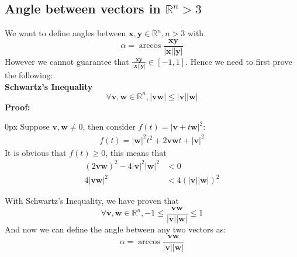 \documentclass{article}
\begin{document}
\subsection{Angle between vectors in $\mathbb{R}^n > 3$}
We want to define angles between $\mathbf{x}, \mathbf{y} \in \mathbb{R}^n, n > 3$ with
\begin{equation*}
    \alpha = \arccos\frac{\mathbf{x}\mathbf{y}}{|\mathbf{x}||\mathbf{y}|}
\end{equation*}
However we cannot guarantee that $\frac{\mathbf{x}\mathbf{y}}{|\mathbf{x}||\mathbf{y}|} \in [-1, 1]$. Hence we need to first prove the following:\\
\textbf{Schwartz's Inequality}
\begin{equation*}
    \forall \mathbf{v}, \mathbf{w} \in \mathbb{R}^n, |\mathbf{v}\mathbf{w}| \leq |\mathbf{v}||\mathbf{w}| \tag{1.4.5}
\end{equation*}
\textbf{Proof:}
\begin{addmargin}[10px]{0px}
    Suppose $\mathbf{v}, \mathbf{w} \neq 0$, then consider $f(t) = |\mathbf{v} + t \mathbf{w}|^2$:
    \begin{equation*}
        \begin{split}
            f(t) = |\mathbf{w}|^2 t^2 + 2\mathbf{v}\mathbf{w} t + |\mathbf{v}|^2
        \end{split}
    \end{equation*}
    It is obvious that $f(t) \geq 0$, this means that
    \begin{equation*}
        \begin{split}
            (2\mathbf{v}\mathbf{w})^2 - 4|\mathbf{v}|^2|\mathbf{w}|^2 &< 0\\
            4|\mathbf{v}\mathbf{w}|^2 &< 4(|\mathbf{v}||\mathbf{w}|)^2
        \end{split}
    \end{equation*}
\end{addmargin}
With Schwartz's Inequality, we have proven that
\begin{equation*}
\forall \mathbf{v}, \mathbf{w} \in \mathbb{R}^n, -1 \leq \frac{\mathbf{vw}}{|\mathbf{v}||\mathbf{w}|} \leq 1
\end{equation*}
And now we can define the angle between any two vectors as:
\begin{equation*}
    \alpha = \arccos \frac{\mathbf{vw}}{|\mathbf{v}||\mathbf{w}|}
\end{equation*}
\end{document}
